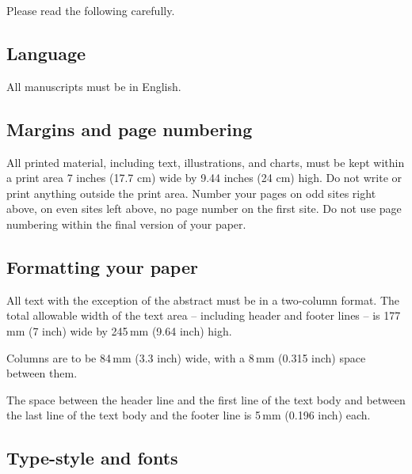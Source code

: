 \documentclass{egpubl}
\begin{document}
	Please read the following carefully.
	
	\subsection{Language}
	
	All manuscripts must be in English.
	
	\subsection{Margins and page numbering}
	
	All printed material, including text, illustrations, and charts,
	must be kept within a print area %
	7 inches (17.7 cm) wide by
	9.44 inches (24 cm) high. Do not write or print anything
	outside the print area. Number your pages on odd sites right
	above, on even sites left above, no page number on the first site.
	Do not use page numbering within the final version of your paper.
	
	
	\subsection{Formatting your paper}
	
	
	All text with the exception of the abstract must be in a two-column format.
	The total allowable width of the text area -- including header and footer
	lines -- is 177\,mm (7 inch) wide by 245\,mm (9.64 inch) high.
	
	Columns are to be 84\,mm (3.3 inch) wide, with a 8\,mm (0.315 inch) space 
	between them.
	
	The space between the header line and the first line of the text body and
	between the last line of the text body and the footer line is 5\,mm
	(0.196 inch) each.
	\subsection{Type-style and fonts}
	
\end{document}
